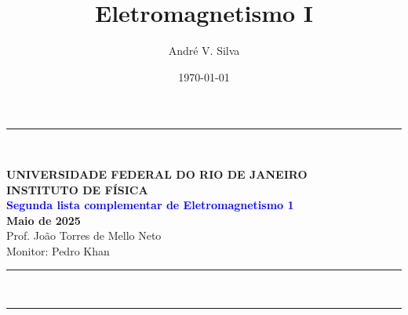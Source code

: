 \documentclass[a4paper,12pt]{article}
\title{ \textbf{\large Eletromagnetismo I }}
\author{Andr\'e V. Silva}
\date{\today}
\begin{document}
\noindent\rule{\linewidth}{0.8pt}\\
\begin{center}
    \textbf{UNIVERSIDADE FEDERAL DO RIO DE JANEIRO}\\
    \textbf{INSTITUTO DE FÍSICA}\\
    \textbf{\textcolor{blue}{Segunda lista complementar de Eletromagnetismo 1}}\\
    \textbf{Maio de 2025}\\
    \vspace{0.5cm}
    Prof. João Torres de Mello Neto\\
    Monitor: Pedro Khan
\end{center}
\noindent\rule{\linewidth}{0.8pt}\\
\maketitle


\noindent\rule{\linewidth}{0.4pt}\\

\justifying
\end{document}

